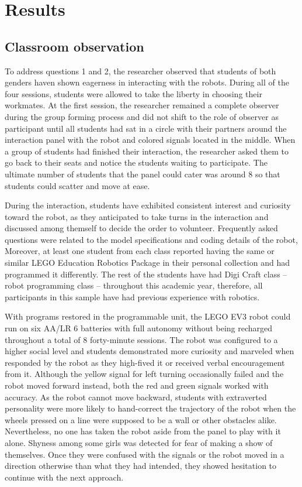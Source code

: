 \documentclass[english]{textolivre}
\begin{document}
\section{Results}\label{sec-format-simple}

\subsection{Classroom observation }
To address questions 1 and 2, the researcher observed that students of both genders haven shown eagerness in interacting with the robots. During all of the four sessions, students were allowed to take the liberty in choosing their workmates. At the first session, the researcher remained a complete observer during the group forming process and did not shift to the role of observer as participant until all students had sat in a circle with their partners around the interaction panel with the robot and colored signals located in the middle. When a group of students had finished their interaction, the researcher asked them to go back to their seats and notice the students waiting to participate. The ultimate number of students that the panel could cater was around 8 so that students could scatter and move at ease.

During the interaction, students have exhibited consistent interest and curiosity toward the robot, as they anticipated to take turns in the interaction and discussed among themself to decide the order to volunteer. Frequently asked questions were related to the model specifications and coding details of the robot, Moreover, at least one student from each class reported having the same or similar LEGO Education Robotics Package in their personal collection and had programmed it differently. The rest of the students have had Digi Craft class – robot programming class – throughout this academic year, therefore, all participants in this sample have had previous experience with robotics.

With programs restored in the programmable unit, the LEGO EV3 robot could run on six AA/LR 6 batteries with full autonomy without being recharged throughout a total of 8 forty-minute sessions. The robot was configured to a higher social level and students demonstrated more curiosity and marveled when responded by the robot as they high-fived it or received verbal encouragement from it. Although the yellow signal for left turning occasionally failed and the robot moved forward instead, both the red and green signals worked with accuracy. As the robot cannot move backward, students with extraverted personality were more likely to hand-correct the trajectory of the robot when the wheels pressed on a line were supposed to be a wall or other obstacles alike. Nevertheless, no one has taken the robot aside from the panel to play with it alone. Shyness among some girls was detected for fear of making a show of themselves. Once they were confused with the signals or the robot moved in a direction otherwise than what they had intended, they showed hesitation to continue with the next approach.
\end{document}
